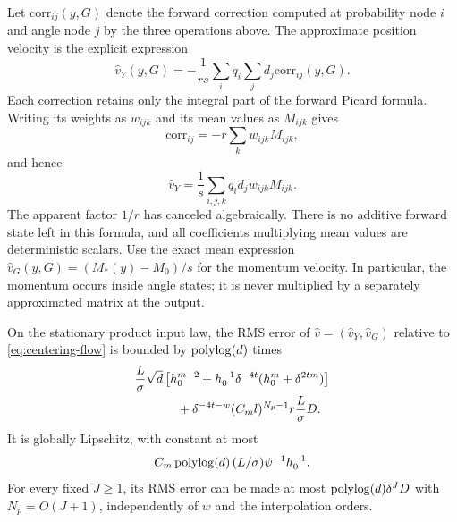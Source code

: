 Let $\mathrm{corr}_{ij}(y,G)$ denote the forward correction computed at
probability node $i$ and angle node $j$ by the three operations above.
The approximate position velocity is the explicit expression
\begin{equation}\label{eq:kernel-approximate-velocity}
 \widehat v_Y(y,G)=-\frac1{rs}\sum_iq_i\sum_jd_j
                         \mathrm{corr}_{ij}(y,G).
\end{equation}
Each correction retains only the integral part of the forward Picard
formula. Writing its weights as $w_{ijk}$ and its mean values as
$M_{ijk}$ gives
\[
 \mathrm{corr}_{ij}=-r\sum_kw_{ijk}M_{ijk},
\]
and hence
\begin{equation}\label{eq:kernel-scalar-expansion}
 \widehat v_Y=\frac1s\sum_{i,j,k}q_i d_j w_{ijk}M_{ijk}.
\end{equation}
The apparent factor $1/r$ has canceled algebraically. There is no
additive forward state left in this formula, and all coefficients
multiplying mean values are deterministic scalars.
Use the exact mean expression
$\widehat v_G(y,G)=(M_*(y)-M_0)/s$ for the momentum velocity.
In particular, the momentum occurs inside angle states; it is never
multiplied by a separately approximated matrix at the output.

\begin{proposition}\label{prop:kernel-circuit}
On the stationary product input law, the RMS error of
$\widehat v=(\widehat v_Y,\widehat v_G)$ relative to
\eqref{eq:centering-flow} is bounded by $\operatorname{polylog}(d)$ times
\begin{equation}\label{eq:kernel-velocity-error}
 \begin{split}
 &\frac L\sigma\sqrt d
 \left[h_0^{m-2}+h_0^{-1}\delta^{-4t}
                      (h_0^m+\delta^{2tm})\right]\\
 &\hspace{12mm}+\delta^{-4t-w}(C_ml)^{N_p-1}
                           r\frac L\sigma D.
 \end{split}
\end{equation}
It is globally Lipschitz, with constant at most
\begin{equation}\label{eq:velocity-lipschitz}
 C_m\operatorname{polylog}(d)\,(L/\sigma)\psi^{-1}h_0^{-1}.
\end{equation}
For every fixed $J\ge1$, its RMS error can be made at most
$\operatorname{polylog}(d)\delta^J D$ with $N_p=O(J+1)$, independently of $w$
and the interpolation orders.
\end{proposition}

